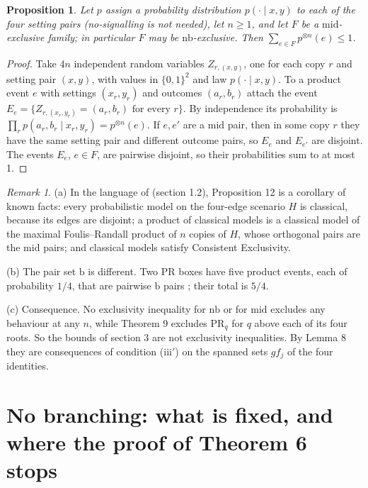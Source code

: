 \documentclass[11pt,a4paper]{article}
\newtheorem{proposition}[theorem]{Proposition}
\theoremstyle{definition}
\theoremstyle{remark}
\newtheorem{remark}[theorem]{Remark}
\newcommand{\PR}{\mathrm{PR}}
\newcommand{\nb}{\mathrm{nb}}
\newcommand{\md}{\mathrm{mid}}
\newcommand{\br}{\mathrm{b}}
\begin{document}
\begin{proposition}\label{p:excl}
Let $p$ assign a probability distribution $p(\cdot \mid x, y)$ to each of the four setting pairs (no-signalling is not needed), let $n \ge 1$, and let $F$ be a $\md$-exclusive family; in particular $F$ may be $\nb$-exclusive. Then $\sum_{e \in F} p^{\otimes n}(e) \le 1$.
\end{proposition}

\begin{proof}
Take $4n$ independent random variables $Z_{r,(x,y)}$, one for each copy $r$ and setting pair $(x, y)$, with values in $\{0, 1\}^2$ and law $p(\cdot \mid x, y)$. To a product event $e$ with settings $(x_r, y_r)$ and outcomes $(a_r, b_r)$ attach the event $E_e = \{Z_{r,(x_r,y_r)} = (a_r, b_r) \text{ for every } r\}$. By independence its probability is $\prod_r p(a_r, b_r \mid x_r, y_r) = p^{\otimes n}(e)$. If $e, e'$ are a $\md$ pair, then in some copy $r$ they have the same setting pair and different outcome pairs, so $E_e$ and $E_{e'}$ are disjoint. The events $E_e$, $e \in F$, are pairwise disjoint, so their probabilities sum to at most 1.
\end{proof}

\begin{remark}\label{r:excl}
(a) In the language of \cite{AFLS} (section 1.2), Proposition 12 is a corollary of known facts: every probabilistic model on the four-edge scenario $H$ is classical, because its edges are disjoint; a product of classical models is a classical model of the maximal Foulis--Randall product of $n$ copies of $H$, whose orthogonal pairs are the $\md$ pairs; and classical models satisfy Consistent Exclusivity.

(b) The pair set $\br$ is different. Two PR boxes have five product events, each of probability $1/4$, that are pairwise $\br$ pairs \cite{FSA+}; their total is $5/4$.

(c) Consequence. No exclusivity inequality for $\nb$ or for $\md$ excludes any behaviour at any $n$, while Theorem 9 excludes $\PR_q$ for $q$ above each of its four roots. So the bounds of section 3 are not exclusivity inequalities. By Lemma 8 they are consequences of condition (iii$'$) on the spanned sets $g f_j$ of the four identities.
\end{remark}

\section{No branching: what is fixed, and where the proof of Theorem 6 stops}
\end{document}
